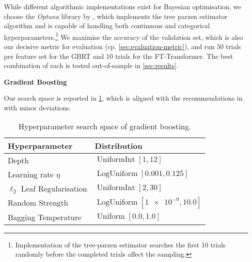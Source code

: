While different algorithmic implementations exist for Bayesian optimisation, we choose the \emph{Optuna} library by \textcite[][1--10]{akibaOptunaNextgenerationHyperparameter2019}, which implements the tree parzen estimator algorithm and is capable of handling both continuous and categorical hyperparameters.\footnote{Implementation of the tree-parzen estimator searches the first 10 trials randomly before the completed trials affect the sampling.} We maximise the accuracy of the validation set, which is also our decisive metric for evaluation (cp. \cref{sec:evaluation-metric}), and run $\num{50}$ trials per feature set for the \gls{GBRT} and $\num{10}$ trials for the FT-Transformer. The best combination of each is tested out-of-sample in \cref{sec:results}.

\textbf{Gradient Boosting}

Our search space is reported in \cref{tab:hyperparameter-space-gbm}, which is aligned with the recommendations in \textcites[][20]{prokhorenkovaCatBoostUnbiasedBoosting2018}[][18]{gorishniyRevisitingDeepLearning2021}[][4]{rubachevRevisitingPretrainingObjectives2022} with minor deviations.

\begin{table}[H]
    \centering
    \caption[Hyperparameter Search Space of Gradient Boosting]{Hyperparameter search space of gradient boosting.}
    \label{tab:hyperparameter-space-gbm}
    \begin{tabular}{@{}ll@{}}
        \toprule
        Hyperparameter               & Distribution                                  \\ \midrule
        Depth                        & $\operatorname{UniformInt}[1,12]$             \\
        Learning rate $\eta$         & $\operatorname{LogUniform}[0.001, 0.125]$     \\
        $\ell_2$ Leaf Regularisation & $\operatorname{UniformInt}[2, 30]$            \\
        Random Strength              & $\operatorname{LogUniform}[\num{1e-9}, 10.0]$ \\
        Bagging Temperature          & $\operatorname{Uniform}[0.0, 1.0]$            \\ \bottomrule
    \end{tabular}
\end{table}

